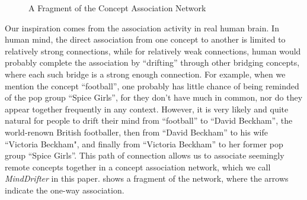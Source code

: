 %
%
\begin{figure}[th]
\centering
{}
\caption{A Fragment of the Concept Association Network}
\label{fig:can}
\shrink
\end{figure}

Our inspiration comes from the association activity in real human brain.
In human mind, the direct association from one concept to another is
limited to relatively strong connections,
while for relatively weak connections, human would probably complete
the association by ``drifting'' through other bridging concepts, where each
such bridge is a strong enough connection.
For example, when we mention the concept ``football'',
one probably has little chance of being reminded of the pop group
``Spice Girls'', for they don't have much
in common, nor do they appear together frequently in any context.
However, it is very likely and quite natural for people to drift their mind
from ``football'' to ``David Beckham'', the world-renown British footballer,
then from ``David Beckham'' to his wife
``Victoria Beckham", and finally from ``Victoria Beckham''
to her former pop group ``Spice Girls''. This path of connection allows us
to associate seemingly remote concepts together in a concept association
network, which we call {\em MindDrifter} in this paper.
 shows a fragment of the network, where
the arrows indicate the one-way association.

